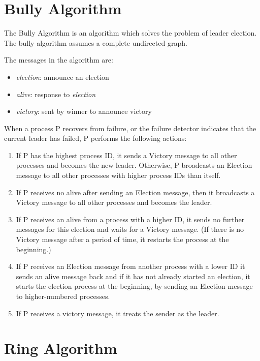 \documentclass{report}
\begin{document}
\section{Bully Algorithm}

The Bully Algorithm is an algorithm which solves the problem of leader election. The bully algorithm assumes a complete undirected graph.

The messages in the algorithm are:
\begin{itemize}
  \item \textit{election}: announce an election
  \item \textit{alive}: response to \textit{election}
  \item \textit{victory}: sent by winner to announce victory
\end{itemize}

When a process P recovers from failure, or the failure detector indicates that the current leader has failed, P performs the following actions:



\begin{enumerate}
\item If P has the highest process ID, it sends a Victory message to all other processes and becomes the new leader. Otherwise, P broadcasts an Election message to all other processes with higher process IDs than itself.
\item If P receives no alive after sending an Election message, then it broadcasts a Victory message to all other processes and becomes the leader.
\item If P receives an alive from a process with a higher ID, it sends no further messages for this election and waits for a Victory message. (If there is no Victory message after a period of time, it restarts the process at the beginning.)
\item If P receives an Election message from another process with a lower ID it sends an alive message back and if it has not already started an election, it starts the election process at the beginning, by sending an Election message to higher-numbered processes.
\item If P receives a victory message, it treats the sender as the leader.
\end{enumerate}




\section{Ring Algorithm}
\end{document}
